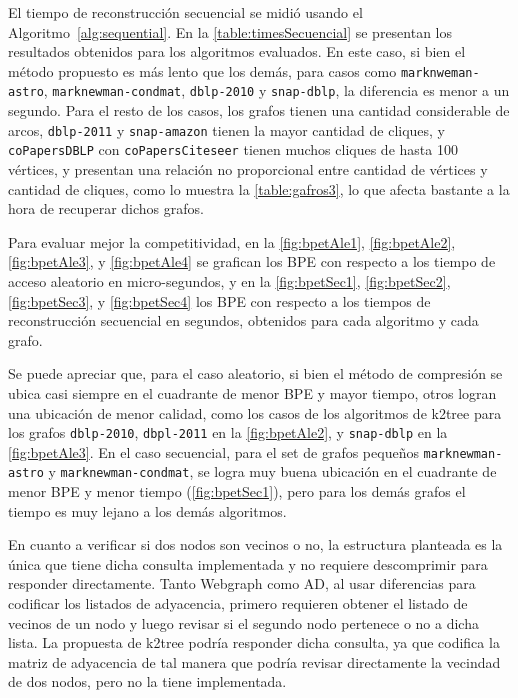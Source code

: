 

El tiempo de reconstrucción secuencial se midió usando el Algoritmo~\ref{alg:sequential}. En la \autoref{table:timesSecuencial} se presentan los resultados obtenidos para los algoritmos evaluados. En este caso, si bien el método propuesto es más lento que los demás, para casos como \texttt{marknweman-astro}, \texttt{marknewman-condmat}, \texttt{dblp-2010} y \texttt{snap-dblp}, la diferencia es menor a un segundo. Para el resto de los casos, los grafos tienen una cantidad considerable de arcos, \texttt{dblp-2011} y \texttt{snap-amazon} tienen la mayor cantidad de cliques, y \texttt{coPapersDBLP} con \texttt{coPapersCiteseer} tienen muchos cliques de hasta 100 vértices, y presentan una relación no proporcional entre cantidad de vértices y cantidad de cliques, como lo muestra la \autoref{table:gafros3}, lo que afecta bastante a la hora de recuperar dichos grafos.

Para evaluar mejor la competitividad, en la \autoref{fig:bpetAle1}, \autoref{fig:bpetAle2}, \autoref{fig:bpetAle3}, y \autoref{fig:bpetAle4} se grafican los BPE con respecto a los tiempo de acceso aleatorio en micro-segundos, y en la \autoref{fig:bpetSec1}, \autoref{fig:bpetSec2}, \autoref{fig:bpetSec3}, y \autoref{fig:bpetSec4} los BPE con respecto a los tiempos de reconstrucción secuencial en segundos, obtenidos para cada algoritmo y cada grafo.

Se puede apreciar que, para el caso aleatorio, si bien el método de compresión se ubica casi siempre en el cuadrante de menor BPE y mayor tiempo, otros logran una ubicación de menor calidad, como los casos de los algoritmos de k2tree para los grafos \texttt{dblp-2010}, \texttt{dbpl-2011} en la \autoref{fig:bpetAle2}, y \texttt{snap-dblp} en la \autoref{fig:bpetAle3}. En el caso secuencial, para el set de grafos pequeños \texttt{marknewman-astro} y \texttt{marknewman-condmat}, se logra muy buena ubicación en el cuadrante de menor BPE y menor tiempo (\autoref{fig:bpetSec1}), pero para los demás grafos el tiempo es muy lejano a los demás algoritmos. 

En cuanto a verificar si dos nodos son vecinos o no, la estructura planteada es la única que tiene dicha consulta implementada y no requiere descomprimir para responder directamente. Tanto Webgraph como AD, al usar diferencias para codificar los listados de adyacencia, primero requieren obtener el listado de vecinos de un nodo y luego revisar si el segundo nodo pertenece o no a dicha lista. La propuesta de k2tree podría responder dicha consulta, ya que codifica la matriz de adyacencia de tal manera que podría revisar directamente la vecindad de dos nodos, pero no la tiene implementada.

 










